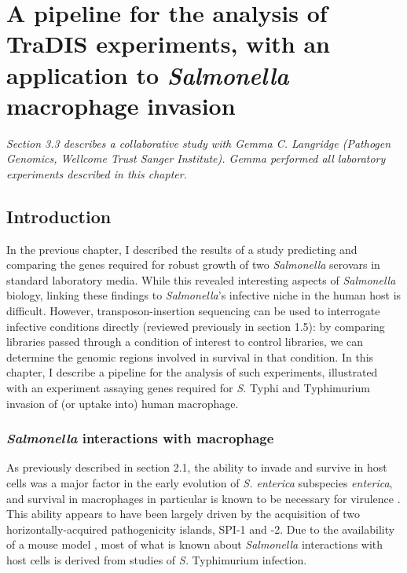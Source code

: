 
\chapter{A pipeline for the analysis of TraDIS experiments, with an application to {\it Salmonella} macrophage invasion}
\label{sec:chapterPingpong}
\ifpdf
    \graphicspath{{Chapter3/Chapter3Figs/EPS/}{Chapter3/Chapter3Figs/}}
\fi

\textit{Section 3.3 describes a collaborative study with Gemma C. Langridge (Pathogen Genomics, Wellcome Trust Sanger Institute). Gemma performed all laboratory experiments described in this chapter.}

\section{Introduction}

In the previous chapter, I described the results of a study predicting and comparing the genes required for robust growth of two \textit{Salmonella} serovars in standard laboratory media. While this revealed interesting aspects of \textit{Salmonella} biology, linking these findings to \textit{Salmonella}'s infective niche in the human host is difficult. However, transposon-insertion sequencing can be used to interrogate infective conditions directly (reviewed previously in section 1.5): by comparing libraries passed through a condition of interest to control libraries, we can determine the genomic regions involved in survival in that condition. In this chapter, I describe a pipeline for the analysis of such experiments, illustrated with an experiment assaying genes required for \textit{S.} Typhi and Typhimurium invasion of (or uptake into) human macrophage.

\subsection{\textit{Salmonella} interactions with macrophage}

As previously described in section 2.1, the ability to invade and survive in host cells was a major factor in the early evolution of \textit{S. enterica} subspecies \textit{enterica}, and survival in macrophages in particular is known to be necessary for virulence \parencite{Fields1986}. This ability appears to have been largely driven by the acquisition of two horizontally-acquired pathogenicity islands, SPI-1 and -2. Due to the availability of a mouse model \parencite{Santos2001}, most of what is known about \textit{Salmonella} interactions with host cells is derived from studies of \textit{S.} Typhimurium infection.

